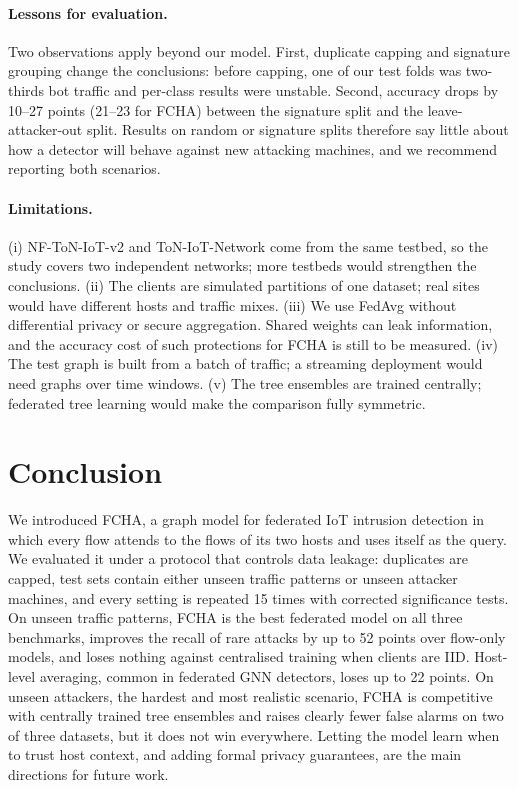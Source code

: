 \documentclass[pdflatex,sn-mathphys-num]{sn-jnl}
\begin{document}
\paragraph{Lessons for evaluation.} Two observations apply beyond our model. First, duplicate capping and signature grouping change the conclusions: before capping, one of our test folds was two-thirds bot traffic and per-class results were unstable. Second, accuracy drops by 10--27 points (21--23 for FCHA) between the signature split and the leave-attacker-out split. Results on random or signature splits therefore say little about how a detector will behave against new attacking machines, and we recommend reporting both scenarios.

\paragraph{Limitations.} (i) NF-ToN-IoT-v2 and ToN-IoT-Network come from the same testbed, so the study covers two independent networks; more testbeds would strengthen the conclusions. (ii) The clients are simulated partitions of one dataset; real sites would have different hosts and traffic mixes. (iii) We use FedAvg without differential privacy or secure aggregation. Shared weights can leak information, and the accuracy cost of such protections for FCHA is still to be measured. (iv) The test graph is built from a batch of traffic; a streaming deployment would need graphs over time windows. (v) The tree ensembles are trained centrally; federated tree learning would make the comparison fully symmetric.

\section{Conclusion}\label{sec:conclusion}

We introduced FCHA, a graph model for federated IoT intrusion detection in which every flow attends to the flows of its two hosts and uses itself as the query. We evaluated it under a protocol that controls data leakage: duplicates are capped, test sets contain either unseen traffic patterns or unseen attacker machines, and every setting is repeated 15 times with corrected significance tests. On unseen traffic patterns, FCHA is the best federated model on all three benchmarks, improves the recall of rare attacks by up to 52 points over flow-only models, and loses nothing against centralised training when clients are IID. Host-level averaging, common in federated GNN detectors, loses up to 22 points. On unseen attackers, the hardest and most realistic scenario, FCHA is competitive with centrally trained tree ensembles and raises clearly fewer false alarms on two of three datasets, but it does not win everywhere. Letting the model learn when to trust host context, and adding formal privacy guarantees, are the main directions for future work.
\end{document}
